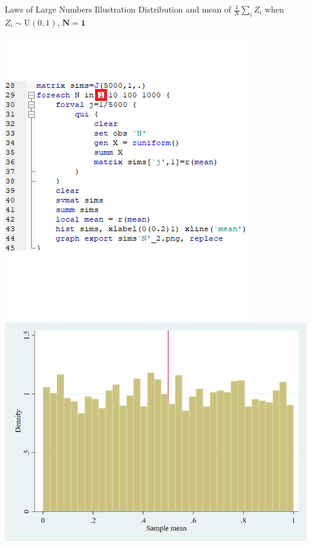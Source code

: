 \documentclass[11pt,english,handout]{beamer}
\begin{document}
\begin{frame}{Laws of Large Numbers Illustration}
	\vspace{0.2cm}
	Distribution and mean of $\frac{1}{N}\sum_i Z_i$ when $Z_i\sim \mathrm{U}(0,1)$, $\mathbf{N=1}$
	
	\begin{center}
		\includegraphics[scale=0.4]{Stata5.png} \includegraphics[scale=0.25]{sims1_2.png}
	\end{center}
	
\end{frame}
\end{document}
